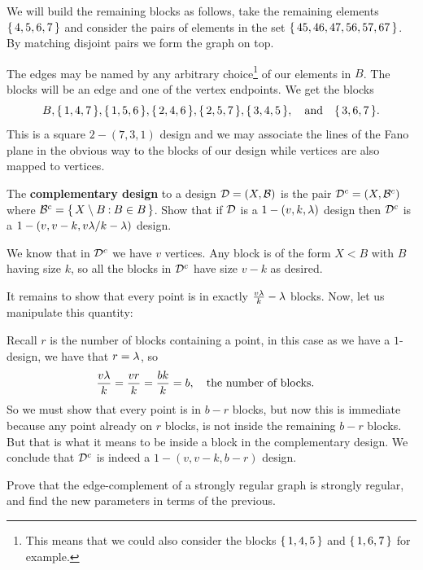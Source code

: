 \documentclass[12pt]{memoir}
\begin{document}
\begin{ptcbr}
\begin{center}
    \end{center}
    We will build the remaining blocks as follows, take the remaining elements $\{\,4,5,6,7\,\}$ and consider the pairs of elements in the set $\{\,45,46,47,56,57,67\,\}$. By matching disjoint pairs we form the graph on top.\par 
    The edges may be named by any arbitrary choice\footnote{This means that we could also consider the blocks $\{\,1,4,5\,\}$ and $\{\,1,6,7\,\}$ for example.} of our elements in $B$. The blocks will be an edge and one of the vertex endpoints. We get the blocks 
    $$B,\{\,1,4,7\,\},\{\,1,5,6\,\},\{\,2,4,6\,\},\{\,2,5,7\,\},\{\,3,4,5\,\},\quad\text{and}\quad\{\,3,6,7\,\}.$$
    This is a square $2-(7,3,1)$ design and we may associate the lines of the Fano plane in the obvious way to the blocks of our design while vertices are also mapped to vertices. 
\end{ptcbr}

\begin{Ej}[Exercise 4]
    The \textbf{complementary design} to a design $\mathcal{D} = (X, \mathcal{B})$ is the pair $\mathcal{D}^c = (X, \mathcal{B}^c)$ where $\mathcal{B}^c = \{\,X \setminus B \mathbin{:} B \in B\,\}$. Show that if $\mathcal{D}$ is a $1 - (v, k, \lambda)$ design then $\mathcal{D}^c$ is a $1 - (v, v - k, v\lambda/k-\lambda)$ design.
\end{Ej}
\begin{ptcbr}
We know that in $\mathcal{D}^c$ we have $v$ vertices. Any block is of the form $X\less B$ with $B$ having size $k$, so all the blocks in $\mathcal{D}^c$ have size $v-k$ as desired.\par 
It remains to show that every point is in exactly $\frac{v\lambda}{k}-\lambda$ blocks. Now, let us manipulate this quantity:\par 
Recall $r$ is the number of blocks containing a point, in this case as we have a $1$-design, we have that $r=\lambda$, so 
$$\frac{v\lambda}{k}=\frac{vr}{k}=\frac{bk}{k}=b,\quad\text{the number of blocks.}\quad$$
So we must show that every point is in $b-r$ blocks, but now this is immediate because any point already on $r$ blocks, is not inside the remaining $b-r$ blocks. But that is what it means to be inside a block in the complementary design. We conclude that $\mathcal{D}^c$ is indeed a $1-(v,v-k,b-r)$ design.
\end{ptcbr}

\begin{Ej}[Exercise 6]
    Prove that the edge-complement of a strongly regular graph is strongly regular, and find the new parameters in terms of the previous.
\end{Ej}
\end{document}
